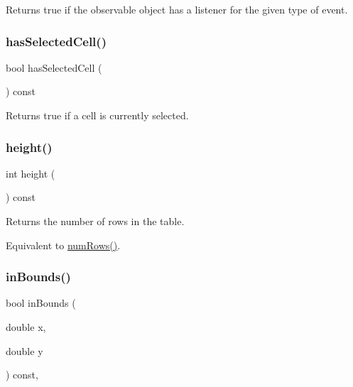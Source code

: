 Returns true if the observable object has a listener for the given type of event. 

\mbox{\label{classsgl_1_1GTable_a4a1007a3d14cd35f0bd514cc0b29886b}} 
\subsubsection{\texorpdfstring{has\+Selected\+Cell()}{hasSelectedCell()}}
{\footnotesize\ttfamily bool has\+Selected\+Cell (\begin{DoxyParamCaption}{ }\end{DoxyParamCaption}) const\hspace{0.3cm}{\ttfamily [virtual]}}



Returns true if a cell is currently selected. 

\mbox{\label{classsgl_1_1GTable_ad3774f6419003470f54fd495124ef51f}} 
\subsubsection{\texorpdfstring{height()}{height()}}
{\footnotesize\ttfamily int height (\begin{DoxyParamCaption}{ }\end{DoxyParamCaption}) const\hspace{0.3cm}{\ttfamily [virtual]}}



Returns the number of rows in the table. 

Equivalent to \mbox{\hyperlink{classsgl_1_1GTable_a00b7e69dd5c43e42cc91db26c459ad8b}{num\+Rows()}}. \mbox{\label{classsgl_1_1GInteractor_afc480f652b8c5f1fb255e2269ce68879}} 
\subsubsection{\texorpdfstring{in\+Bounds()}{inBounds()}\hspace{0.1cm}{\footnotesize\ttfamily [1/2]}}
{\footnotesize\ttfamily bool in\+Bounds (\begin{DoxyParamCaption}\item[{double}]{x,  }\item[{double}]{y }\end{DoxyParamCaption}) const\hspace{0.3cm}{\ttfamily [virtual]}, {\ttfamily [inherited]}}




